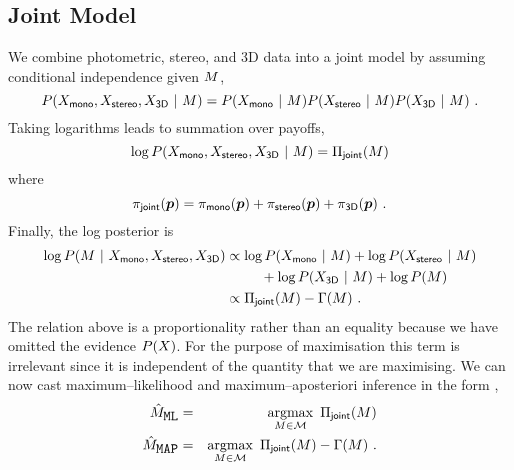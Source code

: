 \subsection{Joint Model}
We combine photometric, stereo, and 3D data into a joint model by
assuming conditional independence given $\Scene$,
\begin{equation}
  P(\Observations_{\textsf{mono}}, \Observations_{\textsf{stereo}}, \Observations_{\textsf{3D}} ~|~ \Scene)
  =
    P(\Observations_{\textsf{mono}} ~|~ \Scene)
    P(\Observations_{\textsf{stereo}} ~|~ \Scene)
    P(\Observations_{\textsf{3D}} ~|~ \Scene) ~.
  \label{eq:full-posterior}
\end{equation}
Taking logarithms leads to summation over payoffs,
\begin{equation}
  \log P(\Observations_{\textsf{mono}}, \Observations_{\textsf{stereo}}, \Observations_{\textsf{3D}} ~|~ \Scene)
  = \ScenePayoff_{\textsf{joint}}(\Scene)
\end{equation}
where
\begin{equation}
  \JointPayoff(\Pixel) =
  \MonoPayoff(\Pixel) + 
  \StereoPayoff(\Pixel) +
  \DepthPayoff(\Pixel) ~.
\end{equation}
Finally, the log posterior is
\begin{equation}
  \begin{split}
    \log P(\Scene ~|~ \Observations_{\textsf{mono}}, \Observations_{\textsf{stereo}}, \Observations_{\textsf{3D}})
    & \propto
      \log P(\Observations_{\textsf{mono}} ~|~ \Scene)
      +\log P(\Observations_{\textsf{stereo}} ~|~ \Scene) \\
    & \qquad + \log P(\Observations_{\textsf{3D}} ~|~ \Scene) + \log P(\Scene)\\
    & \propto \ScenePayoff_{\textsf{joint}}(\Scene) - \ScenePenalty(\Scene)~.
  \end{split}
  \label{eq:joint-posterior}
\end{equation}
The relation above is a proportionality rather than an equality
because we have omitted the evidence $P(\Observations)$. For the
purpose of maximisation this term is irrelevant since it is
independent of the quantity that we are maximising. We can now cast
maximum--likelihood and maximum--aposteriori inference in the form
,
\begin{eqnarray}
  \EstimatedScene_{\mbox{\tt ML}} &=& 
    \argmax_{\Scene\in\SetOfScenes}\limits~
    \ScenePayoff_{\textsf{joint}}(\Scene)\\
  \EstimatedScene_{\mbox{\tt MAP}} &=& 
    \argmax_{\Scene\in\SetOfScenes}\limits~
    \ScenePayoff_{\textsf{joint}}(\Scene) - \ScenePenalty(\Scene) ~.
\end{eqnarray}

